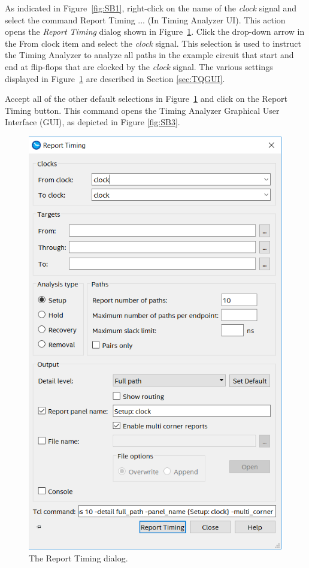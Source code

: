 \documentclass[11pt, twoside, pdftex]{article}
\begin{document}
As indicated in Figure~\ref{fig:SB1}, right-click on the name of the {\it clock} signal 
and select the command {\sf Report Timing ... (In Timing Analyzer UI)}. This action opens
the {\it Report Timing} dialog shown in Figure~\ref{fig:SB2}. Click the drop-down arrow
in the {\sf From clock} item and select the {\it clock} signal. This selection is used to
instruct the Timing Analyzer to analyze all paths in the example circuit that start and end at
flip-flops that are clocked by the {\it clock} signal. The various settings displayed in 
Figure~\ref{fig:SB2} are described in Section \ref{sec:TQGUI}.

Accept all of the other default selections in Figure~\ref{fig:SB2} and click on 
the {\sf Report Timing} button. This command opens the Timing Analyzer Graphical User Interface
(GUI), as depicted in Figure \ref{fig:SB3}.

\begin{figure}[H]
\begin{center}
\includegraphics[scale=0.6]{figures/SB2.png}
\end{center}
\caption{The Report Timing dialog.}
\label{fig:SB2}
\end{figure}
\end{document}
